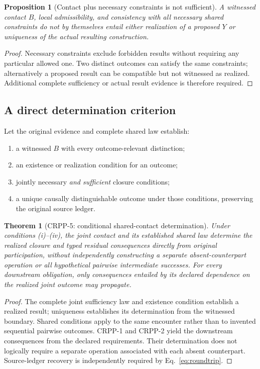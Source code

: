 \documentclass[11pt]{article}
\newtheorem{proposition}[definition]{Proposition}
\newtheorem{theorem}[definition]{Theorem}
\begin{document}
\begin{proposition}[Contact plus necessary constraints is not sufficient]
A witnessed contact $B$, local admissibility, and consistency
with all \emph{necessary} shared constraints do not by themselves
entail either realization of a proposed $Y$ or uniqueness
of the actual resulting construction.
\end{proposition}
\begin{proof}
Necessary constraints exclude forbidden results without
requiring any particular allowed one. Two distinct outcomes
can satisfy the same constraints; alternatively a proposed
result can be compatible but not witnessed as realized.
Additional complete sufficiency or actual result evidence
is therefore required.
\end{proof}

\subsection{A direct determination criterion}
Let the original evidence and complete shared law establish:
\begin{enumerate}[label=(\roman*)]
\item a witnessed $B$ with every outcome-relevant distinction;
\item an existence or realization condition for an outcome;
\item jointly necessary \emph{and sufficient} closure conditions;
\item a unique causally distinguishable outcome under those
conditions, preserving the original source ledger.
\end{enumerate}

\begin{theorem}[CRPP-5: conditional shared-contact determination]
Under conditions (i)--(iv), the joint contact and its
established shared law determine the realized closure and
typed residual consequences directly from original
participation, without independently constructing a
separate absent-counterpart operation or all hypothetical
pairwise intermediate successes. For every downstream
obligation, only consequences entailed by its declared
dependence on the realized joint outcome may propagate.
\end{theorem}
\begin{proof}
The complete joint sufficiency law and existence condition
establish a realized result; uniqueness establishes its
determination from the witnessed boundary. Shared conditions
apply to the same encounter rather than to invented
sequential pairwise outcomes. CRPP-1 and CRPP-2 yield
the downstream consequences from the declared requirements.
Their determination does not logically require a separate
operation associated with each absent counterpart.
Source-ledger recovery is independently required by
Eq.~\eqref{eq:roundtrip}.
\end{proof}
\end{document}
